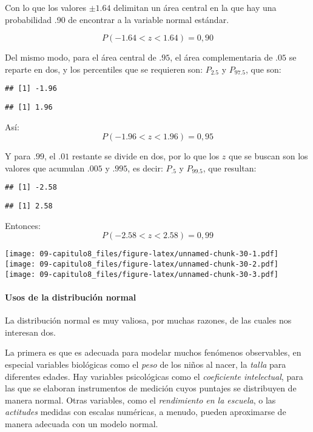 \documentclass[]{article}
\let\oldparagraph\paragraph
\renewcommand{\paragraph}[1]{\oldparagraph{#1}\mbox{}}
\begin{document}
Con lo que los valores \(\pm1.64\) delimitan un área central en la que
hay una probabilidad .90 de encontrar a la variable normal estándar.

\[P(- 1.64 < z < 1.64) = 0,90\]

Del mismo modo, para el área central de \(.95\), el área complementaria
de \(.05\) se reparte en dos, y los percentiles que se requieren son:
\(P_{2.5}\) y \(P_{97.5}\), que son:

\begin{verbatim}
## [1] -1.96
\end{verbatim}

\begin{verbatim}
## [1] 1.96
\end{verbatim}

Así: \[P(- 1.96 < z < 1.96) = 0,95\]

Y para \(.99\), el \(.01\) restante se divide en dos, por lo que los
\(z\) que se buscan son los valores que acumulan \(.005\) y \(.995\), es
decir: \(P_{.5}\) y \(P_{99.5}\), que resultan:

\begin{verbatim}
## [1] -2.58
\end{verbatim}

\begin{verbatim}
## [1] 2.58
\end{verbatim}

Entonces: \[P(- 2.58 < z < 2.58) = 0,99\]

\texttt{[image: 09-capitulo8\_files/figure-latex/unnamed-chunk-30-1.pdf]}
\texttt{[image: 09-capitulo8\_files/figure-latex/unnamed-chunk-30-2.pdf]}
\texttt{[image: 09-capitulo8\_files/figure-latex/unnamed-chunk-30-3.pdf]}

\hypertarget{usos-de-la-distribuciuxf3n-normal}{%
\paragraph{Usos de la distribución
normal}\label{usos-de-la-distribuciuxf3n-normal}}

La distribución normal es muy valiosa, por muchas razones, de las cuales
nos interesan dos.

La primera es que es adecuada para modelar muchos fenómenos observables,
en especial variables biológicas como el \emph{peso} de los niños al
nacer, la \emph{talla} para diferentes edades. Hay variables
psicológicas como el \emph{coeficiente intelectual}, para las que se
elaboran instrumentos de medición cuyos puntajes se distribuyen de
manera normal. Otras variables, como el \emph{rendimiento en la
escuela}, o las \emph{actitudes} medidas con escalas numéricas, a
menudo, pueden aproximarse de manera adecuada con un modelo normal.
\end{document}
